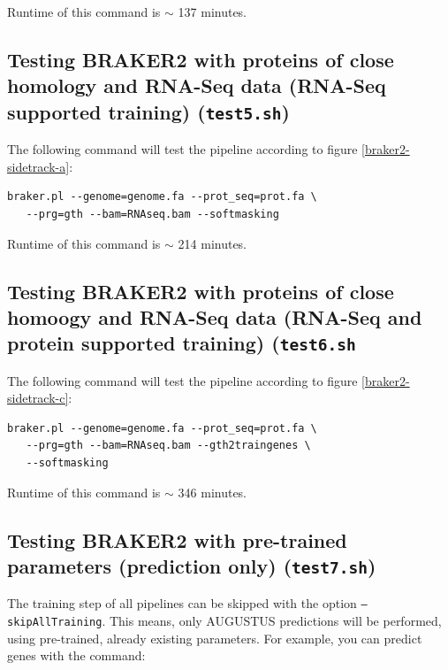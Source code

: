\documentclass[]{article}
\begin{document}
Runtime of this command is \(\sim\) 137 minutes.

\subsection{Testing BRAKER2 with proteins of close homology and RNA-Seq data (RNA-Seq supported training) (\texttt{test5.sh})}\label{testing-braker2-with-proteins-of-close-homology-and-rna-seq-data-rna-seq-supported-training-test5.sh}

The following command will test the pipeline according to figure
\ref{braker2-sidetrack-a}:

\begin{verbatim}
braker.pl --genome=genome.fa --prot_seq=prot.fa \
   --prg=gth --bam=RNAseq.bam --softmasking
\end{verbatim}

Runtime of this command is \(\sim\) 214 minutes.

\subsection{Testing BRAKER2 with proteins of close homoogy and RNA-Seq data (RNA-Seq and protein supported training) (\texttt{test6.sh}}\label{testing-braker2-with-proteins-of-close-homoogy-and-rna-seq-data-rna-seq-and-protein-supported-training-test6.sh}

The following command will test the pipeline according to figure
\ref{braker2-sidetrack-c}:

\begin{verbatim}
braker.pl --genome=genome.fa --prot_seq=prot.fa \
   --prg=gth --bam=RNAseq.bam --gth2traingenes \
   --softmasking
\end{verbatim}

Runtime of this command is \(\sim\) 346 minutes.

\subsection{Testing BRAKER2 with pre-trained parameters (prediction only)
(\texttt{test7.sh})}\label{testing-braker2-with-pre-trained-parameters-prediction-only-test7.sh}

The training step of all pipelines can be skipped with the option
\texttt{–skipAllTraining}. This means, only AUGUSTUS predictions will be
performed, using pre-trained, already existing parameters. For example,
you can predict genes with the command:
\end{document}
